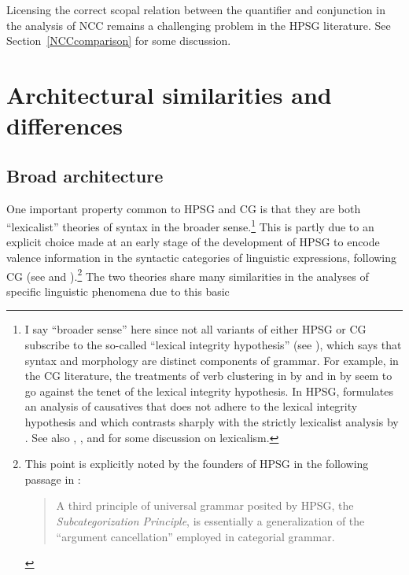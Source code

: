 \documentclass[output=paper
                ,modfonts
 	        ,biblatex
                ,babelshorthands
                ,newtxmath
                ,draftmode
                ,colorlinks, citecolor=brown
]{langscibook}
\begin{document}
Licensing the correct scopal relation between the quantifier and
conjunction in the analysis of NCC remains a challenging problem in
the HPSG literature. See Section~\ref{NCCcomparison} for some
discussion.

\section{Architectural similarities and differences \label{architecture}}

\subsection{Broad architecture}

One important property common to HPSG and CG is that they are both
``lexicalist'' theories of syntax in the broader sense.\footnote{I say
``broader sense'' here since not all variants of either HPSG or CG subscribe to the
so-called ``lexical integrity hypothesis'' (see 
), which says that syntax and 
morphology are distinct components of grammar. For example, in the CG literature, 
the treatments of verb clustering in  by \citet{moortgatoehrle94} and
in  by \citet{Kubota2014a-u} seem to go against the tenet of
the lexical integrity hypothesis. In HPSG,
\citet{Gunji99a-u} formulates an analysis of 
causatives that does not adhere to the lexical integrity hypothesis and which 
contrasts sharply with the strictly lexicalist analysis by 
\citet{MSI99a}. 
See also , 
\citet{Bruening2018a, Bruening2018c-u}, \citet{MuellerLexicalism} and \citet{MWArgSt}
for some discussion on lexicalism.} 
This is partly due to an explicit choice made at an early
stage of the development of HPSG to encode valence information in the
syntactic categories of linguistic expressions, following CG
(see  and ).\footnote{This
  point is explicitly noted by the founders of HPSG
  in the following passage in \citet{ps}:

\begin{quote}
A third principle of universal grammar posited by HPSG, the
\textit{Subcategorization Principle}, is essentially a generalization of the
``argument cancellation'' employed in categorial grammar. \hfill \citep[11]{ps}
\end{quote}

}
The two theories share many similarities in the
analyses of specific linguistic phenomena due to this basic
\end{document}
